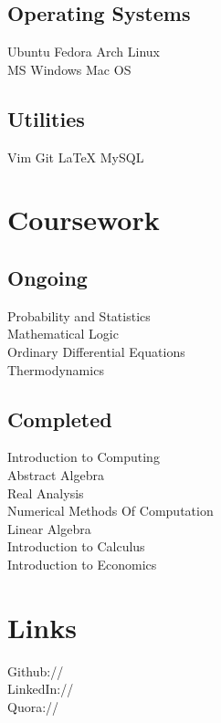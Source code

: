 \documentclass{deedy-resume-openfont}
\begin{document}
\begin{minipage}[t]{0.33\textwidth}
\subsection{Operating Systems}
\textbullet{} Ubuntu \textbullet{} Fedora \textbullet{} Arch Linux \\
\textbullet{} MS Windows  \textbullet{} Mac OS
\subsection{Utilities}
\textbullet{} Vim \textbullet{} Git \textbullet{} \LaTeX \textbullet{} MySQL
\sectionsep




\section{Coursework}
\subsection{Ongoing}
Probability and Statistics \\
Mathematical Logic \\
Ordinary Differential Equations \\
Thermodynamics


\sectionsep

\subsection{Completed}
Introduction to Computing \\
Abstract Algebra\\
Real Analysis \\
Numerical Methods Of Computation \\
Linear Algebra \\
Introduction to Calculus \\ 
Introduction to Economics
\sectionsep


\section{Links} 
Github:// \href{https://github.com/saketharsh}{} \\
LinkedIn://  \href{https://www.linkedin.com/in/saket-harsh-iitk}{} \\
Quora://  \href{https://www.quora.com/Saket-Harsh}{}
\sectionsep



%
%

\end{minipage} 
\end{document}
